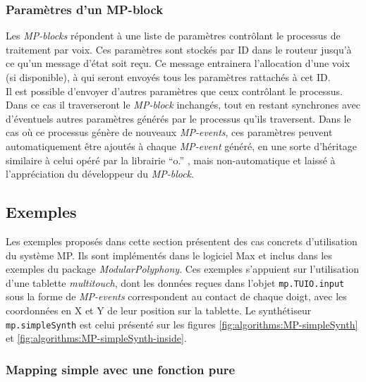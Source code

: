 \subsubsection{Paramètres d'un MP-block}

\noindent Les \textit{MP-blocks} répondent à une liste de paramètres contrôlant le processus de traitement par voix. Ces paramètres sont stockés par ID dans le routeur jusqu'à ce qu'un message d'état soit reçu. Ce message entrainera l'allocation d'une voix (si disponible), à qui seront envoyés tous les paramètres rattachés à cet ID.\\
\indent Il est possible d'envoyer d'autres paramètres que ceux contrôlant le processus. Dans ce cas il traverseront le \textit{MP-block} inchangés, tout en restant synchrones avec d'éventuels autres paramètres générés par le processus qu'ils traversent. Dans le cas où ce processus génère de nouveaux \textit{MP-events}, ces paramètres peuvent automatiquement être ajoutés à chaque \textit{MP-event} généré, en une sorte d'héritage similaire à celui opéré par la librairie ``o.'' \cite{freed_composability_2011}, mais non-automatique et laissé à l'appréciation du développeur du \textit{MP-block}.

\subsection{Exemples}

\noindent Les exemples proposés dans cette section présentent des cas concrets d'utilisation du système MP. Ils sont implémentés dans le logiciel Max et inclus dans les exemples du package \textit{ModularPolyphony}. Ces exemples s'appuient sur l'utilisation d'une tablette \textit{multitouch}, dont les données reçues dans l'objet \verb|mp.TUIO.input| sous la forme de \textit{MP-events} correspondent au contact de chaque doigt, avec les coordonnées en X et Y de leur position sur la tablette. Le synthétiseur \verb|mp.simpleSynth| est celui présenté sur les figures \ref{fig:algorithms:MP-simpleSynth} et \ref{fig:algorithms:MP-simpleSynth-inside}.

\subsubsection{Mapping simple avec une fonction pure}

